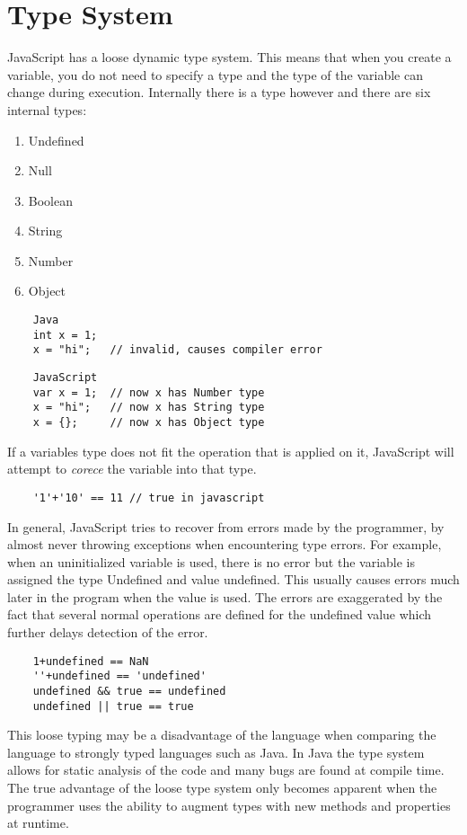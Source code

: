 \documentclass{report}
\begin{document}
\section{Type System}
	JavaScript has a loose dynamic type system. This means that when you create a variable, you do not need to specify a type and the type of the variable can change during execution. Internally there is a type however and there are six internal types:
	\begin{enumerate}
	\item Undefined
	\item Null
	\item Boolean
	\item String
	\item Number
	\item Object
	\end{enumerate}
		\begin{verbatim}
	Java
	int x = 1;
	x = "hi";   // invalid, causes compiler error
	\end{verbatim}
	\begin{verbatim}
	JavaScript
	var x = 1;  // now x has Number type
	x = "hi";   // now x has String type
	x = {};     // now x has Object type
	\end{verbatim}
	If a variables type does not fit the operation that is applied on it, JavaScript will attempt to \emph{corece} the variable into that type.
	\begin{verbatim}
	'1'+'10' == 11 // true in javascript
	\end{verbatim}
	In general, JavaScript tries to recover from errors made by the programmer, by almost never throwing exceptions when encountering type errors. For example, when an uninitialized variable is used, there is no error but the variable is assigned the type Undefined and value undefined. This usually causes errors much later in the program when the value is used. The errors are exaggerated by the fact that several normal operations are defined for the undefined value which further delays detection of the error.
	\begin{verbatim}
	1+undefined == NaN
	''+undefined == 'undefined'
	undefined && true == undefined
	undefined || true == true
	\end{verbatim}
This loose typing may be a disadvantage of the language when comparing the language to strongly typed languages such as Java. In Java the type system allows for static analysis of the code and many bugs are found at compile time. The true advantage of the loose type system only becomes apparent when the programmer uses the ability to augment types with new methods and properties at runtime.
\end{document}
